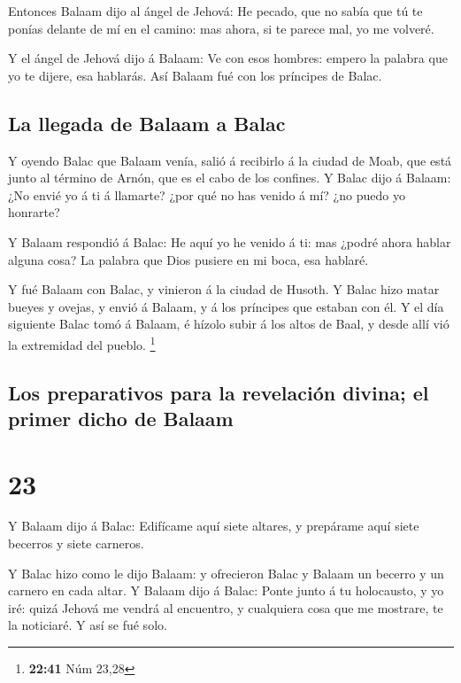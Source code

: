 Entonces Balaam dijo al ángel de Jehová: He pecado, que
no sabía que tú te ponías delante de mí en el camino: mas ahora, si te
parece mal, yo me volveré.

 Y el ángel de Jehová dijo á Balaam: Ve con esos hombres:
empero la palabra que yo te dijere, esa hablarás. Así Balaam fué con los
príncipes de Balac.

\hypertarget{la-llegada-de-balaam-a-balac}{%
\subsection{La llegada de Balaam a
Balac}\label{la-llegada-de-balaam-a-balac}}

 Y oyendo Balac que Balaam venía, salió á recibirlo á la
ciudad de Moab, que está junto al término de Arnón, que es el cabo de
los confines.  Y Balac dijo á Balaam: ¿No envié yo á ti á
llamarte? ¿por qué no has venido á mí? ¿no puedo yo honrarte?

 Y Balaam respondió á Balac: He aquí yo he venido á ti:
mas ¿podré ahora hablar alguna cosa? La palabra que Dios pusiere en mi
boca, esa hablaré.

 Y fué Balaam con Balac, y vinieron á la ciudad de
Husoth.  Y Balac hizo matar bueyes y ovejas, y envió á
Balaam, y á los príncipes que estaban con él.  Y el día
siguiente Balac tomó á Balaam, é hízolo subir á los altos de Baal, y
desde allí vió la extremidad del pueblo. \footnote{\textbf{22:41} Núm
  23,28}

\hypertarget{los-preparativos-para-la-revelaciuxf3n-divina-el-primer-dicho-de-balaam}{%
\subsection{Los preparativos para la revelación divina; el primer dicho
de
Balaam}\label{los-preparativos-para-la-revelaciuxf3n-divina-el-primer-dicho-de-balaam}}

\hypertarget{section-22}{%
\section{23}\label{section-22}}

 Y Balaam dijo á Balac: Edifícame aquí siete altares, y
prepárame aquí siete becerros y siete carneros.

 Y Balac hizo como le dijo Balaam: y ofrecieron Balac y
Balaam un becerro y un carnero en cada altar.  Y Balaam
dijo á Balac: Ponte junto á tu holocausto, y yo iré: quizá Jehová me
vendrá al encuentro, y cualquiera cosa que me mostrare, te la noticiaré.
Y así se fué solo.


